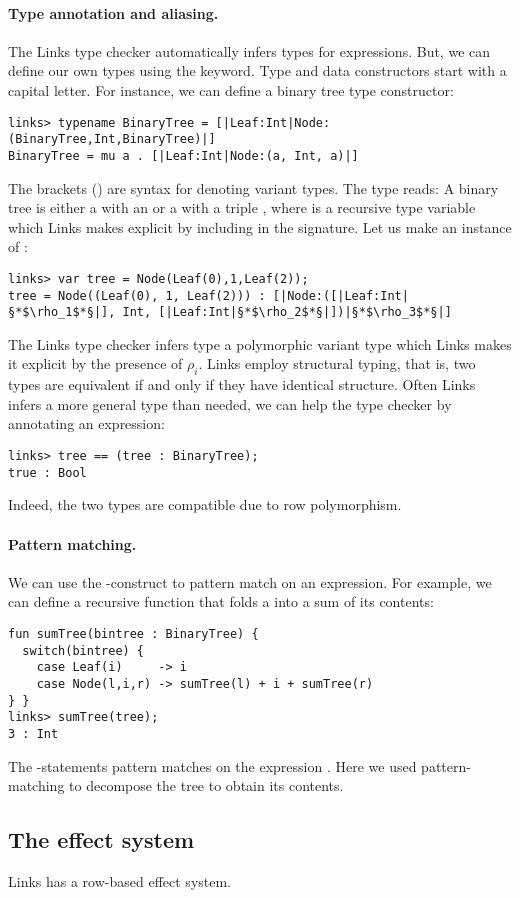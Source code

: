 \paragraph{Type annotation and aliasing.} The Links type checker automatically infers types for expressions. But, we can define our own types using the  keyword. Type and data constructors start with a capital letter. For instance, we can define a binary tree type constructor:
\begin{lstlisting}[style=links]
links> typename BinaryTree = [|Leaf:Int|Node:(BinaryTree,Int,BinaryTree)|]
BinaryTree = mu a . [|Leaf:Int|Node:(a, Int, a)|]
\end{lstlisting}
The brackets (\code{[|...|]}) are syntax for denoting variant types. The type reads: A binary tree is either a  with an  or a  with a triple , where  is a recursive type variable which Links makes explicit by including  in the signature.
Let us make an instance of :
\begin{lstlisting}[style=links]
links> var tree = Node(Leaf(0),1,Leaf(2));
tree = Node((Leaf(0), 1, Leaf(2))) : [|Node:([|Leaf:Int|§*$\rho_1$*§|], Int, [|Leaf:Int|§*$\rho_2$*§|])|§*$\rho_3$*§|]
\end{lstlisting}
The Links type checker infers type a polymorphic variant type which Links makes it explicit by the presence of $\rho_i$. Links employ structural typing, that is, two types are equivalent if and only if they have identical structure. Often Links infers a more general type than needed, we can help the type checker by annotating an expression:
\begin{lstlisting}[style=links]
links> tree == (tree : BinaryTree);
true : Bool
\end{lstlisting}
Indeed, the two types are compatible due to row polymorphism.

\paragraph{Pattern matching.} We can use the -construct to pattern match on an expression. For example, we can define a recursive function that folds a  into a sum of its contents:
\begin{lstlisting}[style=links]
fun sumTree(bintree : BinaryTree) {
  switch(bintree) {
    case Leaf(i)     -> i
    case Node(l,i,r) -> sumTree(l) + i + sumTree(r)
} }
links> sumTree(tree);
3 : Int
\end{lstlisting}
The -statements pattern matches on the expression . Here we used pattern-matching to decompose the tree to obtain its contents.
\subsection{The effect system}
Links has a row-based effect system.